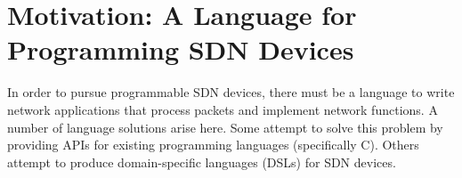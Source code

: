 %
%
%
%
%

\section{Motivation: A Language for Programming SDN Devices}

In order to pursue programmable SDN devices, there must be a language to write network applications that process packets and implement network functions.
A number of language solutions arise here.
Some attempt to solve this problem by providing APIs for existing programming
languages (specifically C).
Others attempt to produce domain-specific languages (DSLs) for SDN devices.

